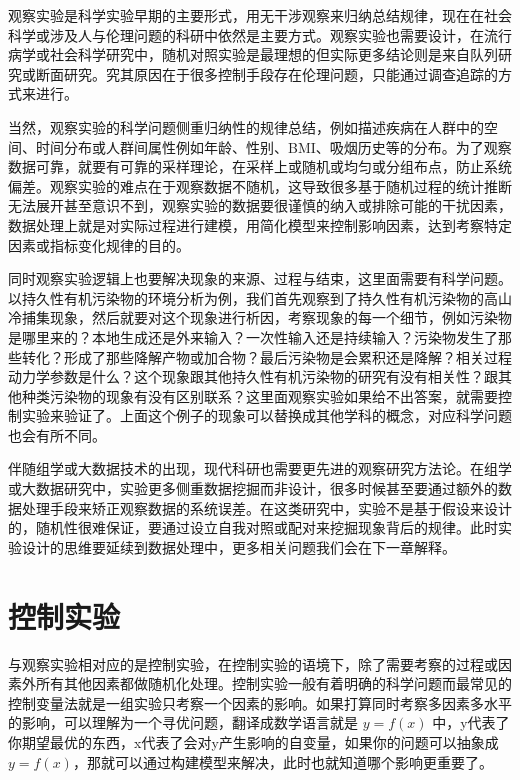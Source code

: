 \documentclass[]{tufte-book}
\begin{document}
观察实验是科学实验早期的主要形式，用无干涉观察来归纳总结规律，现在在社会科学或涉及人与伦理问题的科研中依然是主要方式。观察实验也需要设计，在流行病学或社会科学研究中，随机对照实验是最理想的但实际更多结论则是来自队列研究或断面研究。究其原因在于很多控制手段存在伦理问题，只能通过调查追踪的方式来进行。

当然，观察实验的科学问题侧重归纳性的规律总结，例如描述疾病在人群中的空间、时间分布或人群间属性例如年龄、性别、BMI、吸烟历史等的分布。为了观察数据可靠，就要有可靠的采样理论，在采样上或随机或均匀或分组布点，防止系统偏差。观察实验的难点在于观察数据不随机，这导致很多基于随机过程的统计推断无法展开甚至意识不到，观察实验的数据要很谨慎的纳入或排除可能的干扰因素，数据处理上就是对实际过程进行建模，用简化模型来控制影响因素，达到考察特定因素或指标变化规律的目的。

同时观察实验逻辑上也要解决现象的来源、过程与结束，这里面需要有科学问题。以持久性有机污染物的环境分析为例，我们首先观察到了持久性有机污染物的高山冷捕集现象，然后就要对这个现象进行析因，考察现象的每一个细节，例如污染物是哪里来的？本地生成还是外来输入？一次性输入还是持续输入？污染物发生了那些转化？形成了那些降解产物或加合物？最后污染物是会累积还是降解？相关过程动力学参数是什么？这个现象跟其他持久性有机污染物的研究有没有相关性？跟其他种类污染物的现象有没有区别联系？这里面观察实验如果给不出答案，就需要控制实验来验证了。上面这个例子的现象可以替换成其他学科的概念，对应科学问题也会有所不同。

伴随组学或大数据技术的出现，现代科研也需要更先进的观察研究方法论。在组学或大数据研究中，实验更多侧重数据挖掘而非设计，很多时候甚至要通过额外的数据处理手段来矫正观察数据的系统误差。在这类研究中，实验不是基于假设来设计的，随机性很难保证，要通过设立自我对照或配对来挖掘现象背后的规律。此时实验设计的思维要延续到数据处理中，更多相关问题我们会在下一章解释。

\hypertarget{ux63a7ux5236ux5b9eux9a8c}{%
\section{控制实验}\label{ux63a7ux5236ux5b9eux9a8c}}

与观察实验相对应的是控制实验，在控制实验的语境下，除了需要考察的过程或因素外所有其他因素都做随机化处理。控制实验一般有着明确的科学问题而最常见的控制变量法就是一组实验只考察一个因素的影响。如果打算同时考察多因素多水平的影响，可以理解为一个寻优问题，翻译成数学语言就是 \(y = f(x)\) 中，y代表了你期望最优的东西，x代表了会对y产生影响的自变量，如果你的问题可以抽象成 \(y = f(x)\)，那就可以通过构建模型来解决，此时也就知道哪个影响更重要了。
\end{document}
